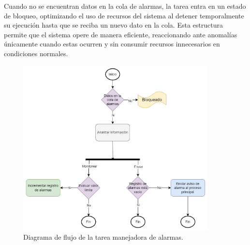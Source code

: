 Cuando no se encuentran datos en la cola de alarmas, la tarea entra en un estado de bloqueo, optimizando el uso de recursos del sistema al detener temporalmente su ejecución hasta que se reciba un nuevo dato en la cola. Esta estructura permite que el sistema opere de manera eficiente, reaccionando ante anomalías únicamente cuando estas ocurren y sin consumir recursos innecesarios en condiciones normales.

\vspace{1cm}
\begin{figure}[htbp]
	\centering
	\includegraphics[width=0.9\textwidth, height=0.6\textheight]{./Figures/DdF_tarea_manejador_alarmas.png}
	\caption{Diagrama de flujo de la tarea manejadora de alarmas.}
	\label{fig:DdF_tarea_manejador_alarmas}
\end{figure}
\vspace{1cm}

\newpage
